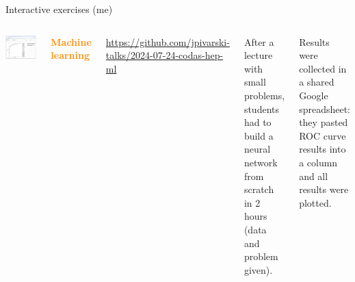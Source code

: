 \documentclass[aspectratio=169]{beamer}
\begin{document}
\begin{frame}{Interactive exercises (me)}
\vspace{0.25 cm}
\large
\begin{columns}
\includegraphics[width=\linewidth]{PLOTS/ml-results-in-google-sheet.png}

\textcolor{darkorange}{\bf Machine learning}

\tiny
\vspace{0.2 cm}
\textcolor{blue}{\href{https://github.com/jpivarski-talks/2024-07-24-codas-hep-ml}{https://github.com/jpivarski-talks/2024-07-24-codas-hep-ml}}

\small
\vspace{0.25 cm}
After a lecture with small problems, students had to build a neural network from scratch in 2 hours (data and problem given).

\small
\vspace{0.25 cm}
Results were collected in a shared Google spreadsheet: they pasted ROC curve results into a column and all results were plotted.
\end{columns}
\end{frame}
\end{document}

